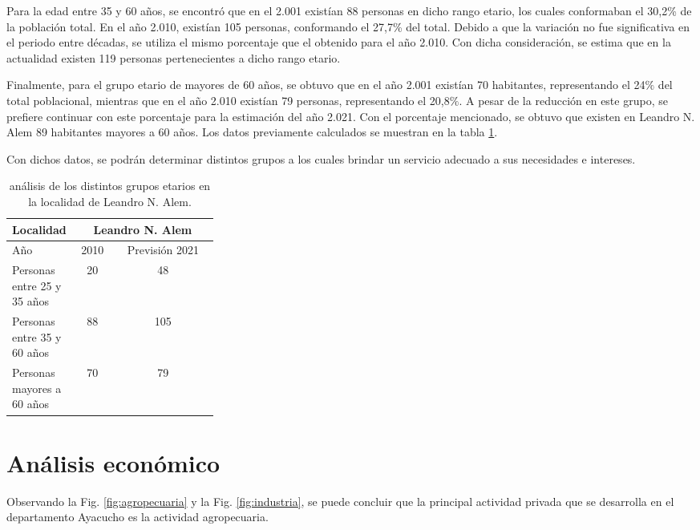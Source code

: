 \documentclass[11pt,a4paper]{article}
\begin{document}
Para la edad entre 35 y 60 años, se encontró que en el 2.001 existían 88 personas en dicho rango etario, los cuales conformaban el 30,2\% de la población total. En el año 2.010, existían 105 personas, conformando el 27,7\% del total.
Debido a que la variación no fue significativa en el periodo entre décadas, se utiliza el mismo porcentaje que el obtenido para el año 2.010. 
Con dicha consideración, se estima que en la actualidad existen 119 personas pertenecientes a dicho rango etario.

Finalmente, para el grupo etario de mayores de 60 años, se obtuvo que en el año 2.001 existían 70 habitantes, representando el 24$\%$ del total poblacional, mientras que en el año 2.010 existían 79 personas, representando el 20,8$\%$. A pesar de la reducción en este grupo, se prefiere continuar con este porcentaje para la estimación del año 2.021.
Con el porcentaje mencionado, se obtuvo que existen en Leandro N. Alem 89 habitantes mayores a 60 años.
Los datos previamente calculados se muestran en la tabla \ref{tab:etario_alem}.

Con dichos datos, se podrán determinar distintos grupos a los cuales brindar un servicio adecuado a sus necesidades e intereses.



\begin{table}[htbp]
  \centering
    \begin{tabular}{|p{0.3\linewidth}|c|c|}
    \hline
    Localidad & \multicolumn{2}{|c|}{Leandro N. Alem} \\
    \hline
    Año  & 2010 & Previsión 2021 \\
    \hline
    Personas entre 25 y 35 años & 20   & 48 \\
    \hline
    Personas entre 35 y 60 años & 88   & 105 \\
    \hline
    Personas mayores a 60 años & 70   & 79 \\
    \hline
    \end{tabular}%
  \caption{análisis de los distintos grupos etarios en la localidad de Leandro N. Alem.}
  \label{tab:etario_alem}%
\end{table}%

\section{Análisis económico}

Observando la Fig. \ref{fig:agropecuaria} y la Fig. \ref{fig:industria}, se puede concluir que la principal actividad privada que se desarrolla en el departamento Ayacucho es la actividad agropecuaria.
\end{document}
